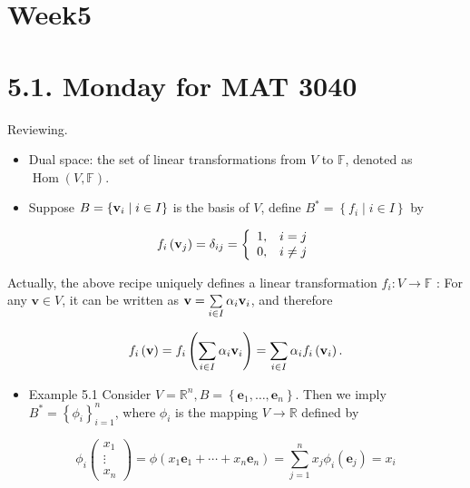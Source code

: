 \documentclass[11pt]{article}
\begin{document}
\section*{Week5}

\section*{5.1. Monday for MAT 3040}

Reviewing.

\begin{itemize}
\item Dual space: the set of linear transformations from \(V\) to \(\mathbb{F}\), denoted as \(\operatorname{Hom}\left( {V,\mathbb{F}}\right)\).
\end{itemize}

\begin{itemize}
\item Suppose \(B = \left\{  {{\bf v}_{i} \mid  i \in  I}\right\}\) is the basis of \(V\), define \({B}^{ * } = \left\{  {{f}_{i} \mid  i \in  I}\right\}\) by
\end{itemize}

\[
{f}_{i}\left( {\bf v}_{j}\right)  = {\delta }_{ij} = \left\{  \begin{array}{ll} 1, & i = j \\  0, & i \neq  j \end{array}\right.
\]

Actually, the above recipe uniquely defines a linear transformation \({f}_{i} : V \rightarrow  \mathbb{F}\) : For any \(\mathbf{v} \in  V\), it can be written as \(\mathbf{v} = \mathop{\sum }\limits_{{i \in  I}}\alpha_{i}{\bf v}_{i}\), and therefore

\[
{f}_{i}\left( \mathbf{v}\right)  = {f}_{i}\left( {\mathop{\sum }\limits_{{i \in  I}}\alpha_{i}{\bf v}_{i}}\right)  = \mathop{\sum }\limits_{{i \in  I}}\alpha_{i}{f}_{i}\left( {\bf v}_{i}\right) .
\]

\begin{itemize}
\item Example 5.1 Consider \(V = {\mathbb{R}}^n,B = \left\{  {{\mathbf{e}}_1,\ldots ,{\mathbf{e}}_n}\right\}\). Then we imply \({B}^{ * } = {\left\{  {\phi }_{i}\right\}  }_{i = 1}^n\), where \({\phi }_{i}\) is the mapping \(V \rightarrow  \mathbb{R}\) defined by
\end{itemize}

\[
{\phi }_{i}\left( \begin{matrix} {x}_1 \\  \vdots \\  {x}_n \end{matrix}\right)  = \phi \left( {{x}_1{\mathbf{e}}_1 + \cdots  + {x}_n{\mathbf{e}}_n}\right)  = \mathop{\sum }\limits_{{j = 1}}^n{x}_{j}{\phi }_{i}\left( {\mathbf{e}}_{j}\right)  = {x}_{i}
\]
\end{document}
